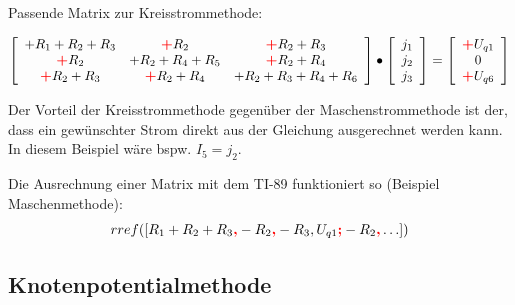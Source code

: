 Passende Matrix zur Kreisstrommethode:

$\left[\begin{array}{ccc}
	+R_1+R_2+R_3 &\text{\textbf{\textcolor{red}{+}}}R_2 &\text{\textbf{\textcolor{red}{+}}}R_2+R_3\\
	\text{\textbf{\textcolor{red}{+}}}R_2 &+R_2+R_4+R_5
	&\text{\textbf{\textcolor{red}{+}}}R_2+R_4\\ 
	\text{\textbf{\textcolor{red}{+}}}R_2+R_3 &\text{\textbf{\textcolor{red}{+}}}R_2+R_4 &+R_2+R_3+R_4+R_6
	\end{array}\right] \bullet 
	\left[\begin{array}{l}j_1\\j_2\\j_3\end{array}\right] = 
	\left[\begin{array}{c}\text{\textbf{\textcolor{red}{+}}}U_{q1}\\0\\
	\text{\textbf{\textcolor{red}{+}}}U_{q6}
\end{array}\right]$

Der Vorteil der Kreisstrommethode gegenüber der Maschenstrommethode ist der, dass ein gewünschter Strom direkt aus der Gleichung ausgerechnet werden kann. In diesem Beispiel wäre bspw. $I_5 = j_2$.

Die Ausrechnung einer Matrix mit dem TI-89 funktioniert so (Beispiel Maschenmethode): $$rref([R_1+R_2+R_3\text{\textbf{\textcolor{red}{,}}}-R_2\text{\textbf{\textcolor{red}{,}}}-R_3,U_{q1}\text{\textbf{\textcolor{red}{;}}}
-R_2\text{\textbf{\textcolor{red}{,}}} \ldots])$$

\subsection{Knotenpotentialmethode}

